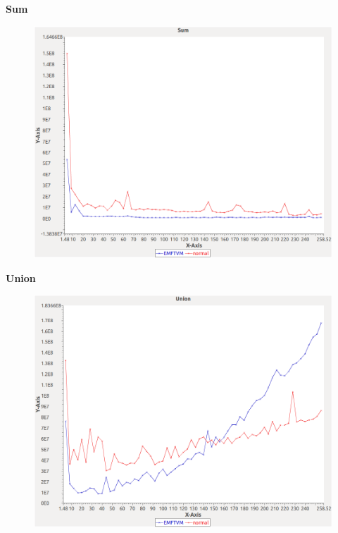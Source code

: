 \noindent\textbf{Sum}

\begin{figure}[h]
\centering
\includegraphics[width=\textwidth]{graphs/orderedset/Sum}
\end{figure}
\pagebreak

\noindent\textbf{Union}

\begin{figure}[h]
\centering
\includegraphics[width=\textwidth]{graphs/orderedset/Union}
\end{figure}
\pagebreak